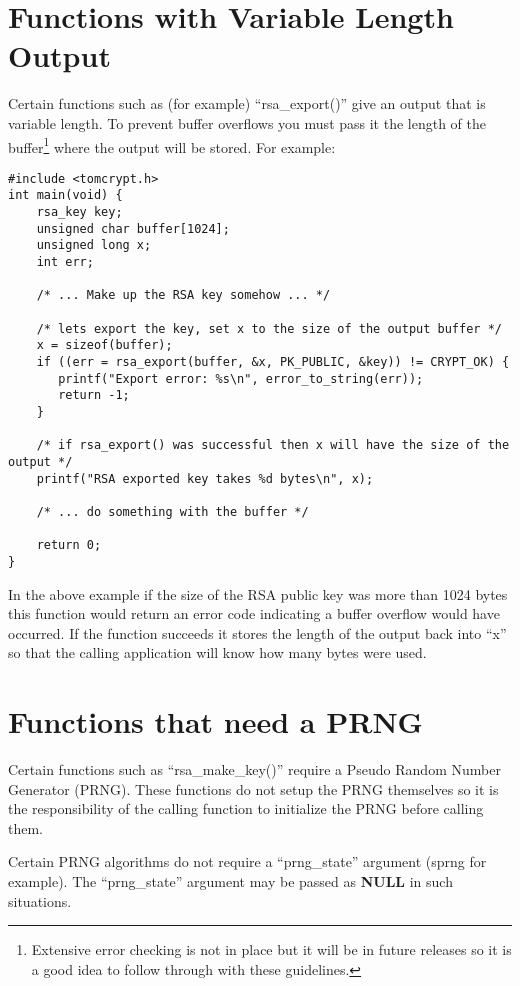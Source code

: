 \documentclass[a4paper]{book}
\begin{document}
\section{Functions with Variable Length Output}
Certain functions such as (for example) ``rsa\_export()'' give an output that is variable length.  To prevent buffer overflows you
must pass it the length of the buffer\footnote{Extensive error checking is not in place but it will be in future releases so it is a good idea to follow through with these guidelines.} where
the output will be stored.  For example:
\begin{small}
\begin{verbatim}
#include <tomcrypt.h>
int main(void) {
    rsa_key key;
    unsigned char buffer[1024];
    unsigned long x;
    int err;

    /* ... Make up the RSA key somehow ... */

    /* lets export the key, set x to the size of the output buffer */
    x = sizeof(buffer);
    if ((err = rsa_export(buffer, &x, PK_PUBLIC, &key)) != CRYPT_OK) {
       printf("Export error: %s\n", error_to_string(err));
       return -1;
    }
    
    /* if rsa_export() was successful then x will have the size of the output */
    printf("RSA exported key takes %d bytes\n", x);

    /* ... do something with the buffer */

    return 0;
}
\end{verbatim}
\end{small}
In the above example if the size of the RSA public key was more than 1024 bytes this function would return an error code
indicating a buffer overflow would have occurred.  If the function succeeds it stores the length of the output
back into ``x'' so that the calling application will know how many bytes were used.

\section{Functions that need a PRNG}
 
Certain functions such as ``rsa\_make\_key()'' require a Pseudo Random Number Generator (PRNG).  These functions do not setup 
the PRNG themselves so it is the responsibility of the calling function to initialize the PRNG before calling them.

Certain PRNG algorithms do not require a ``prng\_state'' argument (sprng for example).  The ``prng\_state'' argument
may be passed as \textbf{NULL} in such situations.
\end{document}
